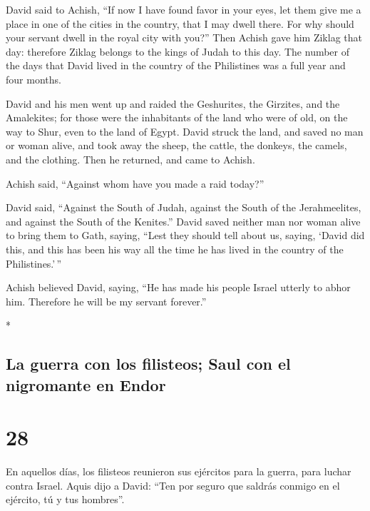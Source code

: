 \begin{paracol}{2}
\begin{otherlanguage}{english}
 David said to Achish, ``If now I have found favor in your
eyes, let them give me a place in one of the cities in the country, that
I may dwell there. For why should your servant dwell in the royal city
with you?''  Then Achish gave him Ziklag that day:
therefore Ziklag belongs to the kings of Judah to this day.
 The number of the days that David lived in the country of
the Philistines was a full year and four months.

 David and his men went up and raided the Geshurites, the
Girzites, and the Amalekites; for those were the inhabitants of the land
who were of old, on the way to Shur, even to the land of Egypt.
 David struck the land, and saved no man or woman alive,
and took away the sheep, the cattle, the donkeys, the camels, and the
clothing. Then he returned, and came to Achish.

 Achish said, ``Against whom have you made a raid
today?''

David said, ``Against the South of Judah, against the South of the
Jerahmeelites, and against the South of the Kenites.'' 
David saved neither man nor woman alive to bring them to Gath, saying,
``Lest they should tell about us, saying, `David did this, and this has
been his way all the time he has lived in the country of the
Philistines.'\,''

 Achish believed David, saying, ``He has made his people
Israel utterly to abhor him. Therefore he will be my servant forever.''

\end{otherlanguage}

\switchcolumn[0]*

\hypertarget{la-guerra-con-los-filisteos-saul-con-el-nigromante-en-endor}{%
\subsection{La guerra con los filisteos; Saul con el nigromante en
Endor}\label{la-guerra-con-los-filisteos-saul-con-el-nigromante-en-endor}}

\hypertarget{section-54}{%
\section{28}\label{section-54}}

 En aquellos días, los filisteos reunieron sus ejércitos
para la guerra, para luchar contra Israel. Aquis dijo a David: ``Ten por
seguro que saldrás conmigo en el ejército, tú y tus hombres''.


\end{paracol}
